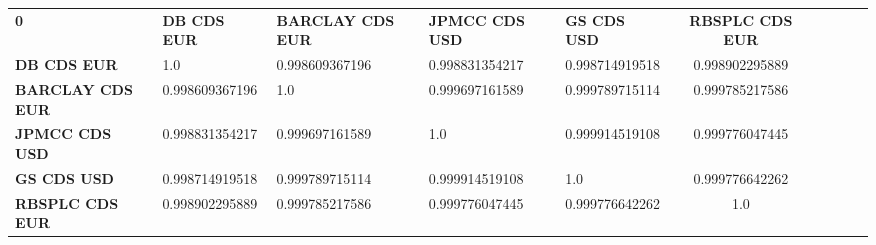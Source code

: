 \begin{tabular}{|l|l|l|l|l|c|c|c|c|c|}
\hline
\textbf{0} & \textbf{DB CDS EUR} & \textbf{BARCLAY CDS EUR} & \textbf{JPMCC CDS USD} & \textbf{GS CDS USD} & \textbf{RBSPLC CDS EUR}\\\hhline{|=|=|=|=|=|=|}
\textbf{DB CDS EUR} & 1.0 & 0.998609367196 & 0.998831354217 & 0.998714919518 & 0.998902295889\\
\textbf{BARCLAY CDS EUR} & 0.998609367196 & 1.0 & 0.999697161589 & 0.999789715114 & 0.999785217586\\
\textbf{JPMCC CDS USD} & 0.998831354217 & 0.999697161589 & 1.0 & 0.999914519108 & 0.999776047445\\
\textbf{GS CDS USD} & 0.998714919518 & 0.999789715114 & 0.999914519108 & 1.0 & 0.999776642262\\
\textbf{RBSPLC CDS EUR} & 0.998902295889 & 0.999785217586 & 0.999776047445 & 0.999776642262 & 1.0\\
\hline
\end{tabular}
